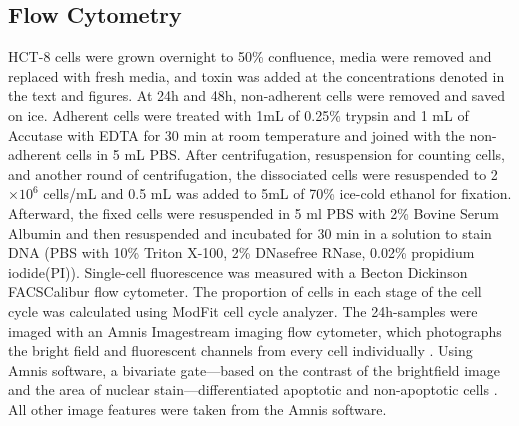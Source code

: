 \subsection{Flow Cytometry}
HCT-8 cells were grown overnight to 50\% confluence, media 
were removed and replaced with fresh media, and toxin was added 
at the concentrations denoted in the text and figures. At 24h 
and 48h, non-adherent cells were removed and saved on ice. Adherent 
cells were treated with 1mL of 0.25\% trypsin and 1 mL of 
Accutase with EDTA for 30 min at room temperature and joined 
with the non-adherent cells in 5 mL PBS. After centrifugation, 
resuspension for counting cells, and another round of centrifugation, 
the dissociated cells were resuspended to 2$\times10^{6}$ cells/mL and 
0.5 mL was added to 5mL of 70\% ice-cold ethanol for fixation. 
Afterward, the fixed cells were resuspended in 5 ml PBS with 
2\% Bovine Serum Albumin and then resuspended and incubated 
for 30 min in a solution to stain DNA (PBS with 10\% Triton 
X-100, 2\% DNasefree RNase, 0.02\% propidium iodide(PI)). 
Single-cell fluorescence was measured with a Becton Dickinson 
FACSCalibur flow cytometer. The proportion of cells in each 
stage of the cell cycle was calculated using ModFit cell 
cycle analyzer. The 24h-samples were imaged with an Amnis 
Imagestream imaging flow cytometer, which photographs the 
bright field and fluorescent channels from every cell 
individually \cite{George:2004jj}. Using Amnis software, a 
bivariate gate—based on the contrast of the brightfield image 
and the area of nuclear stain—differentiated apoptotic and 
non-apoptotic cells \cite{Henery:2008jz}. All other image 
features were taken from the Amnis software.

